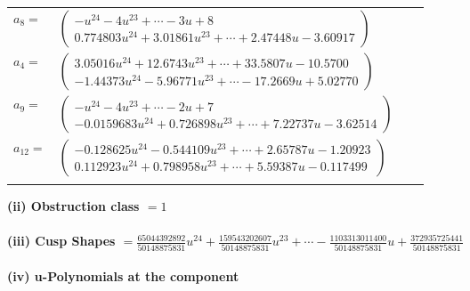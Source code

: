 \documentclass[1p]{elsarticle_modified}
\theoremstyle{definition}
\begin{document}
\begin{tabular}{m{7pt} m{180pt} m{7pt} m{180pt} }
\flushright $a_{8}=$&$\begin{pmatrix}- u^{24}-4 u^{23}+\cdots-3 u+8\\0.774803 u^{24}+3.01861 u^{23}+\cdots+2.47448 u-3.60917\end{pmatrix}$ \\
\flushright $a_{4}=$&$\begin{pmatrix}3.05016 u^{24}+12.6743 u^{23}+\cdots+33.5807 u-10.5700\\-1.44373 u^{24}-5.96771 u^{23}+\cdots-17.2669 u+5.02770\end{pmatrix}$ \\
\flushright $a_{9}=$&$\begin{pmatrix}- u^{24}-4 u^{23}+\cdots-2 u+7\\-0.0159683 u^{24}+0.726898 u^{23}+\cdots+7.22737 u-3.62514\end{pmatrix}$ \\
\flushright $a_{12}=$&$\begin{pmatrix}-0.128625 u^{24}-0.544109 u^{23}+\cdots+2.65787 u-1.20923\\0.112923 u^{24}+0.798958 u^{23}+\cdots+5.59387 u-0.117499\end{pmatrix}$\\&\end{tabular}
\flushleft \textbf{(ii) Obstruction class $= 1$}\\~\\
\flushleft \textbf{(iii) Cusp Shapes $= \frac{65044392892}{50148875831} u^{24}+\frac{159543202607}{50148875831} u^{23}+\cdots-\frac{1103313011400}{50148875831} u+\frac{372935725441}{50148875831}$}\\~\\
\newpage\renewcommand{\arraystretch}{1}
\flushleft \textbf{(iv) u-Polynomials at the component}\newline \\
\end{document}
